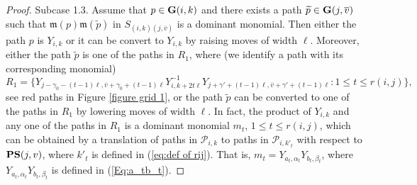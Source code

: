 \documentclass[12pt, reqno]{amsart}
\numberwithin{equation}{section}
\begin{document}
{\begin{proof}
Subcase 1.3. Assume that $p \in {\bf G}(i,k)$ and there exists a path $\widetilde{p}\in {\bf G}(j,\overline{v})$ such that $\mathfrak{m}(p)\mathfrak{m}(\widetilde{p})$ in $S_{(i, k)(j, \overline{v})}$ is a dominant monomial. Then either the path $p$ is $Y_{i,k}$ or it can be convert to $Y_{i,k}$ by raising moves of width $\ell$. Moreover, either the path $\widetilde{p}$ is one of the paths in $R_1$, where (we identify a path with its corresponding monomial)
\[
R_1=\{Y_{j-\gamma_0-(t-1) \ell,\overline{v}+\gamma_0+(t-1) \ell}Y_{i,k+2t \ell}^{-1}Y_{j+\gamma'+(t-1) \ell,\overline{v}+\gamma'+(t-1) \ell}: 1\leq t\leq r(i,j)\},
\]
see red paths in Figure \ref{figure grid 1}, or the path $\widetilde{p}$ can be converted to one of the paths in $R_1$ by lowering moves of width $\ell$. In fact, the product of $Y_{i,k}$ and any one of the paths in $R_1$ is a dominant monomial $m_t$, $1\leq t\leq r(i,j)$, which can be obtained by a translation of paths in $\mathscr{P}_{i,k}$ to paths in $\mathscr{P}_{i,k'_t}$ with respect to ${\bf PS}(j,v)$, where $k'_t$ is defined in (\ref{eq:def of rij}). That is, $m_t=Y_{a_t,\alpha_t}Y_{b_t,\beta_t}$, where $Y_{a_t,\alpha_t}Y_{b_t,\beta_t}$ is defined in (\ref{Eq:a_tb_t}).


\end{proof}}
\end{document}
